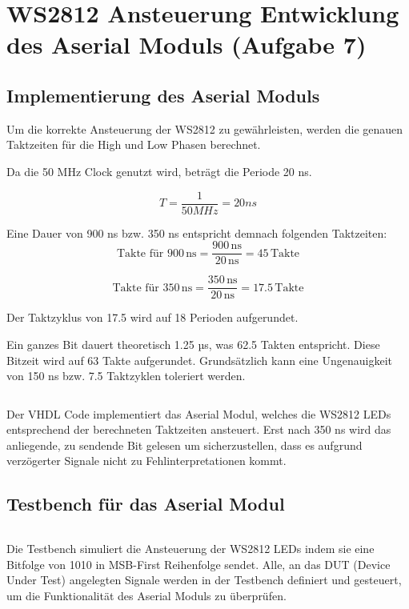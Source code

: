 \newpage
\section{WS2812 Ansteuerung \- Entwicklung des Aserial Moduls (Aufgabe 7)}

\subsection{Implementierung des Aserial Moduls}

Um die korrekte Ansteuerung der WS2812 zu gewährleisten, werden die genauen Taktzeiten für die High und Low Phasen berechnet. 

Da die 50 MHz Clock genutzt wird, beträgt die Periode 20 ns.


$$T=\frac{1}{50 MHz} = 20 ns$$

Eine Dauer von 900 ns bzw. 350 ns entspricht demnach folgenden Taktzeiten:
\[
\text{Takte für } 900\,\mathrm{ns}
= \frac{900\,\mathrm{ns}}{20\,\mathrm{ns}}
= 45\,\text{Takte}
\]

\[
\text{Takte für } 350\,\mathrm{ns}
= \frac{350\,\mathrm{ns}}{20\,\mathrm{ns}}
= 17.5\,\text{Takte}
\]

Der Taktzyklus von 17.5 wird auf 18 Perioden aufgerundet.

Ein ganzes Bit dauert theoretisch 1.25 µs, was 62.5 Takten entspricht. Diese Bitzeit wird auf 63 Takte aufgerundet.
Grundsätzlich kann eine Ungenauigkeit von 150 ns bzw. 7.5 Taktzyklen toleriert werden.

\inputminted[linenos,frame=single,fontsize=\footnotesize]{vhdl}{A7_Abgabe/testbench_ws2812/ws2812_aserial.vhd}

Der VHDL Code implementiert das Aserial Modul, welches die WS2812 LEDs entsprechend der berechneten Taktzeiten ansteuert.
Erst nach 350 ns wird das anliegende, zu sendende Bit gelesen um sicherzustellen, dass es aufgrund verzögerter Signale nicht zu Fehlinterpretationen kommt.

\subsection{Testbench für das Aserial Modul}

\inputminted[linenos,frame=single,fontsize=\footnotesize]{vhdl}{A7_Abgabe/testbench_ws2812/tb_ws2812.vhd}

Die Testbench simuliert die Ansteuerung der WS2812 LEDs indem sie eine Bitfolge von 1010 in MSB-First Reihenfolge sendet.
Alle, an das DUT (Device Under Test) angelegten Signale werden in der Testbench definiert und gesteuert, um die Funktionalität des Aserial Moduls zu überprüfen.

